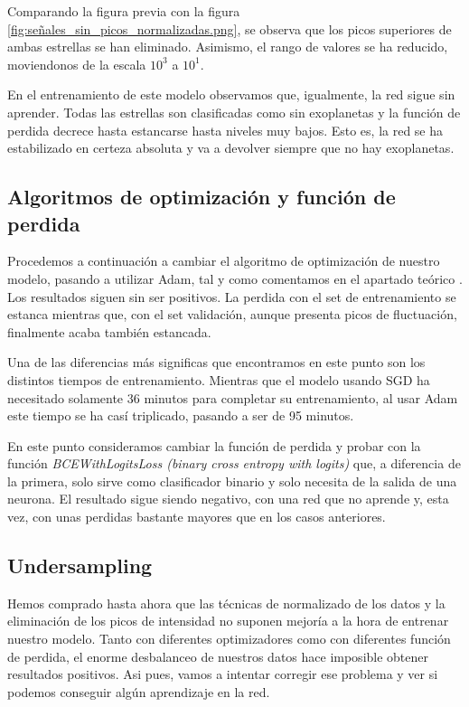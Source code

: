 Comparando la figura previa con la figura \ref{fig:señales_sin_picos_normalizadas.png}, se observa que los picos superiores de ambas estrellas se han eliminado. Asimismo, el rango de valores se ha reducido, moviendonos de la escala $10^3$ a $10^1$.


En el entrenamiento de este modelo observamos que, igualmente, la red sigue sin aprender. Todas las estrellas son clasificadas como sin exoplanetas y la función de perdida decrece hasta estancarse hasta niveles muy bajos. Esto es, la red se ha estabilizado en certeza absoluta y va a devolver siempre que no hay exoplanetas.

\subsection{Algoritmos de optimización y función de perdida}

Procedemos a continuación a cambiar el algoritmo de optimización de nuestro modelo, pasando a utilizar Adam, tal y como comentamos en el apartado teórico . Los resultados siguen sin ser positivos. La perdida con el set de entrenamiento se estanca mientras que, con el set validación, aunque presenta picos de fluctuación, finalmente acaba también estancada.

Una de las diferencias más significas que encontramos en este punto son los distintos tiempos de entrenamiento. Mientras que el modelo usando SGD ha necesitado solamente 36 minutos para completar su entrenamiento, al usar Adam este tiempo se ha casí triplicado, pasando a ser de 95 minutos.

En este punto consideramos cambiar la función de perdida y probar con la función \textit{BCEWithLogitsLoss (binary cross entropy with logits)} que, a diferencia de la primera, solo sirve como clasificador binario y solo necesita de la salida de una neurona. El resultado sigue siendo negativo, con una red que no aprende y, esta vez, con unas perdidas bastante mayores que en los casos anteriores.


\subsection{Undersampling}

Hemos comprado hasta ahora que las técnicas de normalizado de los datos y la eliminación de los picos de intensidad no suponen mejoría a la hora de entrenar nuestro modelo. Tanto con diferentes optimizadores como con diferentes función de perdida, el enorme desbalanceo de nuestros datos hace imposible obtener resultados positivos. Asi pues, vamos a intentar corregir ese problema y ver si podemos conseguir algún aprendizaje en la red.

